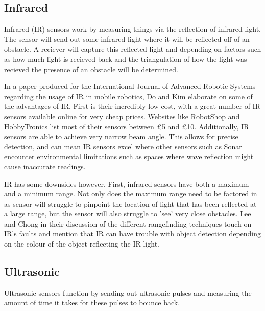 				\subsection{Infrared}
				\label{litreview:infrared}
				Infrared (IR) sensors work by measuring things via the reflection of infrared light. The sensor will send out some infrared light where it will be reflected off of an obstacle. A reciever will capture this reflected light and depending on factors such as how much light is recieved back and the triangulation of how the light was recieved the presence of an obstacle will be determined. 
				
				In a paper produced for the International Journal of Advanced Robotic Systems regarding the usage of IR in mobile robotics, Do and Kim\citep{do2013infrared} elaborate on some of the advantages of IR. First is their incredibly low cost, with a great number of IR sensors available online for very cheap prices. Websites like RobotShop and HobbyTronics list most of their sensors between \pounds{5} and \pounds{10}. Additionally, IR sensors are able to achieve very narrow beam angle. This allows for precise detection, and can mean IR sensors excel where other sensors such as Sonar encounter environmental limitations such as spaces where wave reflection might cause inaccurate readings. 
				
				IR has some downsides however. First, infrared sensors have both a maximum and a minimum range. Not only does the maximum range need to be factored in as sensor will struggle to pinpoint the location of light that has been reflected at a large range, but the sensor will also struggle to 'see' very close obstacles. Lee and Chong \cite{lee2011low} in their discussion of the different rangefinding techniques touch on IR's faults and mention that IR can have trouble with object detection depending on the colour of the object reflecting the IR light.
				
				
				\subsection{Ultrasonic}
				Ultrasonic sensors function by sending out ultrasonic pulses and measuring the amount of time it takes for these pulses to bounce back. 
				
